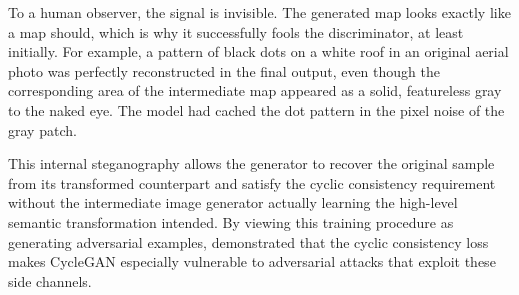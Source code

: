 To a human observer, the signal is invisible. The generated map looks exactly like a map should, which is why it successfully fools the discriminator, at least initially. For example, a pattern of black dots on a white roof in an original aerial photo was perfectly reconstructed in the final output, even though the corresponding area of the intermediate map appeared as a solid, featureless gray to the naked eye. The model had cached the dot pattern in the pixel noise of the gray patch.

This internal steganography allows the generator to recover the original sample from its transformed counterpart and satisfy the cyclic consistency requirement without the intermediate image generator actually learning the high-level semantic transformation intended.
By viewing this training procedure as generating adversarial examples, \citet{chu2017cycleganmastersteganography} demonstrated that the cyclic consistency loss makes CycleGAN especially vulnerable to adversarial attacks that exploit these side channels.

